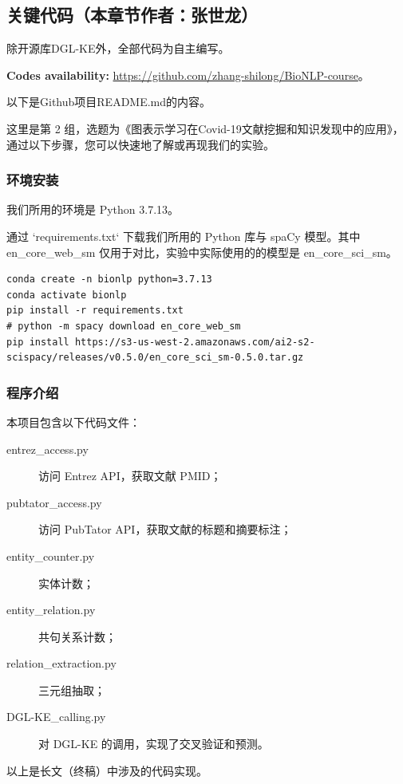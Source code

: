 \documentclass[twocolumn]{article}
\begin{document}
\subsection{关键代码（本章节作者：张世龙）}

除开源库DGL-KE外，全部代码为自主编写。\par
{\bf Codes availability:} \url{https://github.com/zhang-shilong/BioNLP-course}。\par
以下是Github项目README.md的内容。\par
这里是第 2 组，选题为《图表示学习在Covid-19文献挖掘和知识发现中的应用》，通过以下步骤，您可以快速地了解或再现我们的实验。\par
\subsubsection{环境安装}
我们所用的环境是 Python 3.7.13。\par
通过 `requirements.txt` 下载我们所用的 Python 库与 spaCy 模型。其中 en\_core\_web\_sm 仅用于对比，实验中实际使用的的模型是 en\_core\_sci\_sm。\par
\begin{lstlisting}
conda create -n bionlp python=3.7.13
conda activate bionlp
pip install -r requirements.txt
# python -m spacy download en_core_web_sm
pip install https://s3-us-west-2.amazonaws.com/ai2-s2-scispacy/releases/v0.5.0/en_core_sci_sm-0.5.0.tar.gz
\end{lstlisting}
\subsubsection{程序介绍}
本项目包含以下代码文件：\par
\begin{description}
	\item[entrez\_access.py] 访问 Entrez API，获取文献 PMID；
	\item[pubtator\_access.py] 访问 PubTator API，获取文献的标题和摘要标注；
	\item[entity\_counter.py] 实体计数；
	\item[entity\_relation.py] 共句关系计数；
	\item[relation\_extraction.py] 三元组抽取；
	\item[DGL-KE\_calling.py] 对 DGL-KE 的调用，实现了交叉验证和预测。
\end{description}\par
以上是长文（终稿）中涉及的代码实现。
\end{document}
